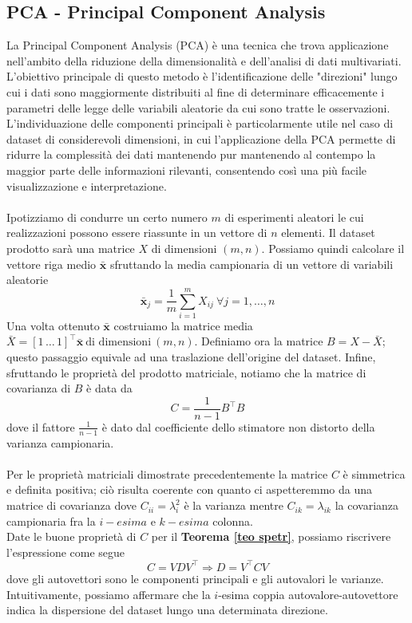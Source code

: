 \documentclass[11pt]{article}
\begin{document}
\subsection{PCA - Principal Component Analysis}
La Principal Component Analysis (PCA) è una tecnica che trova applicazione nell'ambito della riduzione della dimensionalità e dell'analisi di dati multivariati. L'obiettivo principale di questo metodo è l'identificazione delle "direzioni" lungo cui i dati sono maggiormente distribuiti al fine di determinare efficacemente i parametri delle legge delle variabili aleatorie da cui sono tratte le osservazioni. L'individuazione delle componenti principali è particolarmente utile nel caso di dataset di considerevoli dimensioni, in cui l'applicazione della PCA permette di ridurre la complessità dei dati mantenendo pur mantenendo al contempo la maggior parte delle informazioni rilevanti, consentendo così una più facile visualizzazione e interpretazione.\\
\\
Ipotizziamo di condurre un certo numero $m$ di esperimenti aleatori le cui realizzazioni possono essere riassunte in un vettore di $n$ elementi. Il dataset prodotto sarà una matrice $X$ di dimensioni $(m,n)$. Possiamo quindi calcolare il vettore riga medio $\bar{\mathbf{x}}$ sfruttando la media campionaria di un vettore di variabili aleatorie $$ \bar{\mathbf{x}}_j= \frac1m \sum_{i=1}^m X_{ij} \ \forall j=1, \dots, n$$
Una volta ottenuto $\mathbf{\bar{x}}$ costruiamo la matrice media $ \bar{X}= [1 \, \dots \, 1]^\top \bar{\mathbf{x}} \ \text{di dimensioni} \ (m,n)$.
Definiamo ora la matrice $B= X-\bar{X}$; questo passaggio equivale ad una traslazione dell'origine del dataset. Infine, sfruttando le proprietà del prodotto matriciale, notiamo che la matrice di covarianza di $B$ è data da $$ C = \frac{1}{n-1} B^\top B$$ dove il fattore $\frac{1}{n-1}$ è dato dal coefficiente dello stimatore non distorto della varianza campionaria.\\
\\
Per le proprietà matriciali dimostrate precedentemente la matrice $C$ è simmetrica e definita positiva; ciò risulta coerente con quanto ci aspetteremmo da una matrice di covarianza dove $C_{ii} = 	\lambda_i^2$ è la varianza mentre $C_{ik} = 	\lambda_{ik}$ la covarianza campionaria fra la $i-esima$ e $k-esima$ colonna.\\
Date le buone proprietà di $C$ per il \textbf{Teorema \ref{teo spetr}}, possiamo riscrivere l'espressione come segue
\[
C = VDV^\top \Rightarrow D = V^\top CV
\]
dove gli autovettori sono le componenti principali e gli autovalori le varianze. Intuitivamente, possiamo affermare che la $i$-esima coppia autovalore-autovettore indica la dispersione del dataset lungo una determinata direzione.\\
\end{document}

